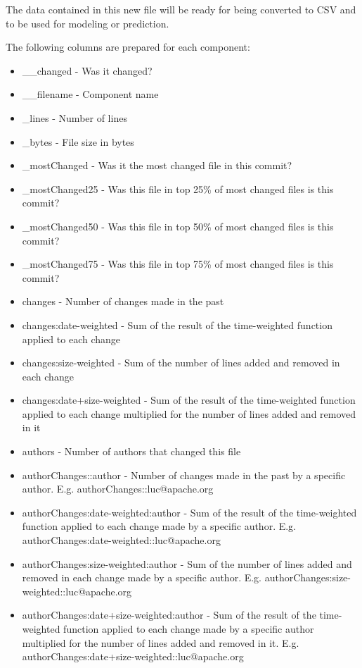 The data contained in this new file will be ready for being converted to CSV and to be used for modeling or prediction.

The following columns are prepared for each component:
%
\begin{itemize}
\item \_\_changed - Was it changed?
\item \_\_filename - Component name
\item \_lines - Number of lines
\item \_bytes - File size in bytes
\item \_mostChanged - Was it the most changed file in this commit?
\item \_mostChanged25 - Was this file in top 25\% of most changed files is this commit?
\item \_mostChanged50 - Was this file in top 50\% of most changed files is this commit?
\item \_mostChanged75 - Was this file in top 75\% of most changed files is this commit?
\item changes - Number of changes made in the past
\item changes:date-weighted - Sum of the result of the time-weighted function applied to each change
\item changes:size-weighted - Sum of the number of lines added and removed in each change
\item changes:date+size-weighted - Sum of the result of the time-weighted function applied to each change multiplied for the number of lines added and removed in it
\item authors - Number of authors that changed this file
\item authorChanges::{author} - Number of changes made in the past by a specific author. E.g. authorChanges::luc@apache.org
\item authorChanges:date-weighted:{author} - Sum of the result of the time-weighted function applied to each change made by a specific author. E.g. authorChanges:date-weighted::luc@apache.org
\item authorChanges:size-weighted:{author} - Sum of the number of lines added and removed in each change made by a specific author. E.g. authorChanges:size-weighted::luc@apache.org
\item authorChanges:date+size-weighted:{author} - Sum of the result of the time-weighted function applied to each change made by a specific author multiplied for the number of lines added and removed in it. E.g. authorChanges:date+size-weighted::luc@apache.org
\end{itemize}

